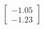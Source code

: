 \documentclass[preview]{standalone}
\begin{document}
\begin{align*}
\begin{bmatrix} -1.05 \\ -1.23 \end{bmatrix}
\end{align*}
\end{document}
